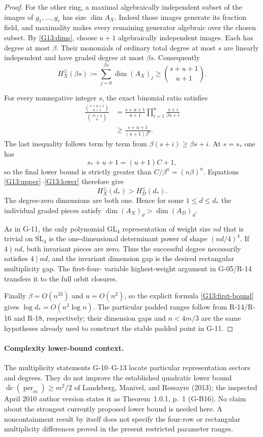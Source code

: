 \documentclass[11pt,a4paper]{article}
\theoremstyle{definition}\newtheorem{definition}{Definition}
\begin{document}
\begin{proof}
For the other ring, a maximal algebraically independent
subset of the images of $g_1,\ldots,g_r$ has size
$\dim A_X$. Indeed those images generate its fraction
field, and maximality makes every remaining generator
algebraic over the chosen subset. By \eqref{G13:dims},
choose $u+1$ algebraically independent images. Each has
degree at most $\beta$. Their monomials of ordinary total
degree at most $s$ are linearly independent and have
graded degree at most $\beta s$. Consequently
\begin{equation}\label{G13:lower}
 H_X^{\leq}(\beta s)
 :=\sum_{j=0}^{\beta s}\dim(A_X)_j
 \geq\binom{s+u+1}{u+1}.
\end{equation}

For every nonnegative integer $s$, the exact binomial ratio
satisfies
\begin{align*}
 \frac{\binom{s+u+1}{u+1}}{\binom{\beta s+u}{u}}
 &=\frac{s+u+1}{u+1}
     \prod_{i=1}^u\frac{s+i}{\beta s+i}\\
 &\geq\frac{s+u+1}{(u+1)\beta^u}.
\end{align*}
The last inequality follows term by term from
$\beta(s+i)\geq\beta s+i$. At $s=s_*$ one has
\[
 s_*+u+1=(u+1)C+1,
\]
so the final lower bound is strictly greater than
$C/\beta^u=(n\beta)^u$. Equations
\eqref{G13:upper}--\eqref{G13:lower} therefore give
\[
 H_X^{\leq}(d_*)>H_D^{\leq}(d_*).
\]
The degree-zero dimensions are both one. Hence for some
$1\leq d\leq d_*$ the individual graded pieces satisfy
$\dim(A_X)_d>\dim(A_D)_d$.

As in G-11, the only polynomial $\mathrm{GL}_4$
representation of weight size $nd$ that is trivial on
$\mathrm{SL}_4$ is the one-dimensional determinant power
of shape $(nd/4)^4$. If $4\nmid nd$, both invariant
pieces are zero. Thus the successful degree necessarily
satisfies $4\mid nd$, and the invariant dimension gap is
the desired rectangular multiplicity gap. The first-four-
variable highest-weight argument in G-05/R-14 transfers
it to the full orbit closures.

Finally $\beta=O(n^{33})$ and $u=O(n^2)$, so the explicit
formula \eqref{G13:first-bound} gives
$\log d_*=O(n^2\log n)$. The particular padded ranges
follow from R-14/R-16 and R-18, respectively; their
dimension gaps and $n<4m/3$ are the same hypotheses already
used to construct the stable padded point in G-11.
\end{proof}

\paragraph{Complexity lower-bound context.}
The multiplicity statements G-10--G-13 locate particular representation
sectors and degrees. They do not improve the established quadratic
lower bound $\overline{\operatorname{dc}}(\operatorname{per}_m)
\geq m^2/2$ of Landsberg, Manivel, and Ressayre (2013);
the inspected April 2010 author version states it as Theorem~1.0.1,
p.~1 (G-B16). No claim about the strongest currently proposed lower
bound is needed here. A noncontainment result by itself does not
specify the four-row or rectangular multiplicity differences proved
in the present restricted parameter ranges.
\end{document}
